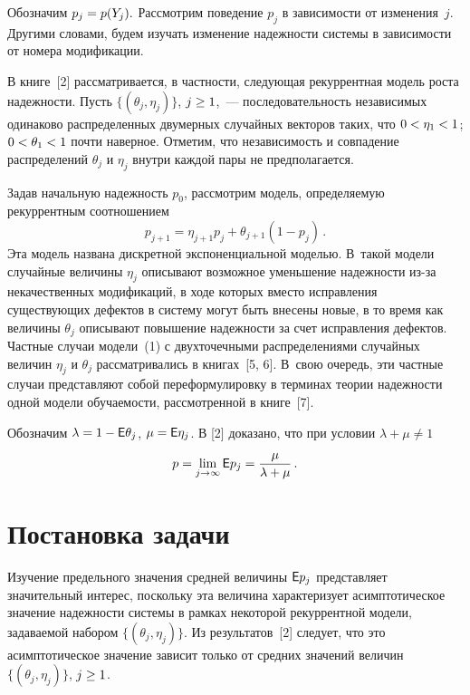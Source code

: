\begin{multicols}{2}
Обозначим $p_j \hm= p(Y_j).$ Рассмотрим поведение $p_j$ в зависимости
от изменения~$j$. Другими словами, будем изучать изменение
надежности системы в зависимости от номера модификации.

В книге~[2] рассматривается, в частности, следующая рекуррентная
модель роста надежности. Пусть  $\{(\theta_j, \eta_j)\}$, $j\hm\ge1$,~--- 
последовательность независимых одинаково распределенных двумерных
случайных векторов таких, что $0 \hm< \eta_1 \hm< 1$; $0 \hm< \theta_1 \hm < 1$
почти наверное. Отметим, что независимость и совпадение
распределений $\theta_j$ и $\eta_j$ внутри каждой пары не
предполагается.

Задав начальную надежность $p_0$, рассмотрим модель, определяемую рекуррентным соотноше\-нием
\begin{equation}
p_{j+1} = \eta_{j+1}p_j + \theta_{j+1}(1-p_j)\,.\label{e1-kud}
\end{equation}
Эта модель названа дискретной экспоненциальной моделью. В~такой
модели случайные величины $\eta_j$ описывают возможное уменьшение
надежности из-за некачественных модификаций, в ходе которых вместо
исправления существующих дефектов в систему могут быть внесены
новые, в то время как величины $\theta_j$ описывают повышение
на\-деж\-ности за счет исправления дефектов. Част\-ные случаи модели~(1) с
двухточечными распределениями случайных величин $\eta_j$ и
$\theta_j$  рассматривались в книгах~[5, 6]. В~свою очередь, эти
частные случаи представляют собой переформулировку в терминах теории
надежности одной модели обучаемости, рассмотренной в книге~[7].

Обозначим $\lambda = 1 \hm- \e\theta_j$, $\mu \hm = \e\eta_j$.
В [2] доказано, что при условии $\lambda+\mu\neq1$
$$
p=\lim\limits_{j\to\infty}{\sf E} p_j = \displaystyle\frac{\displaystyle \mu\mathstrut}{\displaystyle \lambda+\mu\mathstrut}\,.
$$

\section{Постановка задачи}

Изучение предельного значения средней величины  ${\sf E} p_j$
представляет значительный интерес, посколь\-ку эта величина
характеризует асимптотическое значение надежности системы  в рамках
некоторой рекуррентной модели, задаваемой набором $\{(\theta_j,
\eta_j)\}$. Из результатов~[2] следует, что это асимптотическое
значение зависит только от средних значений величин $\{(\theta_j,
\eta_j)\}$, $j\hm\ge1$.


\end{multicols}
